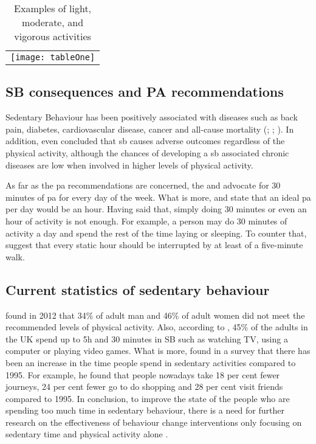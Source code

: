     \begin{table}[h]
        \centering
        \begin{tabular}{c}
            \texttt{[image: tableOne]}
        \end{tabular}
        \caption{Examples of light, moderate, and vigorous activities}
        \label{tab:activity-intensities}
    \end{table}
    
    \subsection{SB consequences and PA recommendations}
    Sedentary Behaviour has been positively associated with diseases such as back pain, diabetes, cardiovascular disease, cancer and all-cause mortality  (\citealp[2895–2905]{wilmot2012}; \citealp[123]{biswas2015}; \citealp[18]{departmentofhealth2010}). In addition, \citet[127]{biswas2015} even concluded that \gls{sb} causes adverse outcomes regardless of the physical activity, although the chances of developing a \gls{sb} associated chronic diseases are low when involved in higher levels of physical activity.
    
    As far as the \gls{pa} recommendations are concerned, the \citet[]{departmentofhealth2011} and \citet[]{townsend2015} advocate for 30 minutes of \gls{pa} for every day of the week. What is more, \citet[]{parkinson2016} and \citet[]{siddique2016} state that an ideal \gls{pa} per day would be an hour. Having said that, simply doing 30 minutes or even an hour of activity is not enough. For example, a person may do 30 minutes of activity a day and spend the rest of the time laying or sleeping. To counter that, \citet[]{swartz2011} suggest that every static hour should be interrupted by at least of a five-minute walk.
    
    \subsection{Current statistics of sedentary behaviour}
    \citet[19]{townsend2015} found in 2012 that 34\% of adult man and 46\% of adult women did not meet the recommended levels of physical activity. Also, according to \citet[81]{townsend2015}, 45\% of the adults in the UK spend up to 5h and 30 minutes in SB such as watching TV, using a computer or playing video games. What is more, \citet{swinford2014} found in a survey that there has been an increase in the time people spend in sedentary activities compared to 1995. For example, he found that people nowadays take 18 per cent fewer journeys, 24 per cent fewer go to do shopping and 28 per cent visit friends compared to 1995. In conclusion, to improve the state of the people who are spending too much time in sedentary behaviour, there is a need for further research on the effectiveness of behaviour change interventions only focusing on sedentary time and physical activity alone \citep[130]{biswas2015}.

